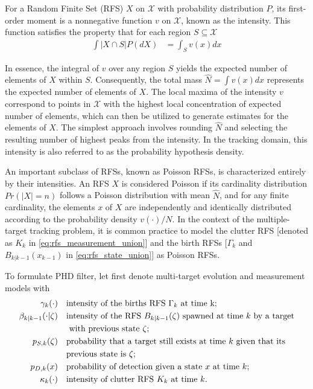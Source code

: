 For a Random Finite Set (RFS) $X$ on $\mathcal{X}$ with probability distribution $P$, its first-order moment is a nonnegative function $v$ on $\mathcal{X}$, known as the intensity. This function satisfies the property that for each region $S \subseteq \mathcal{X}$ \cite{daley2003}
\begin{align}
    \int |X \cap S | P(dX) &= \int_S v(x)dx
\end{align}

In essence, the integral of $v$ over any region $S$ yields the expected number of elements of $X$ within $S$. Consequently, the total mass $\hat{N} = \int v(x)dx$ represents the expected number of elements of $X$. The local maxima of the intensity $v$ correspond to points in $\mathcal{X}$ with the highest local concentration of expected number of elements, which can then be utilized to generate estimates for the elements of $X$. The simplest approach involves rounding $\hat{N}$ and selecting the resulting number of highest peaks from the intensity. In the tracking domain, this intensity is also referred to as the probability hypothesis density.

An important subclass of RFSs, known as Poisson RFSs, is characterized entirely by their intensities. An RFS $X$ is
considered Poisson if its cardinality distribution $Pr(|X| = n)$ follows a Poisson distribution with mean $\hat{N}$,
and for any finite cardinality, the elements $x$ of $X$ are independently and identically distributed according to
the probability density $v(\cdot)/N$. In the context of the multiple-target tracking problem, it is common practice to model the clutter RFS [denoted as $K_k$ in \eqref{eq:rfs_measurement_union}] and the birth RFSs [$\Gamma_k $ and $B_{k|k-1}(x_{k-1})$ in \eqref{eq:rfs_state_union}] as Poisson RFSs.

To formulate PHD filter, let first denote multi-target evolution and measurement models with
\begin{align}
    \gamma_k(\cdot) \quad & \text{intensity of the births RFS $\Gamma_k$ at time k;} \\
    \beta_{k|k-1}(\cdot|\zeta) \quad & \text{intensity of the RFS $B_{k|k-1}(\zeta)$ spawned at time $k$ by a target} \notag \\
                                 \quad &  \text{ with previous state $\zeta$;} \\
    p_{S,k}(\zeta) \quad & \text{probability that a target still exists at time $k$ given that its } \notag \\
                    \quad & \text{previous state is $\zeta$;} \\
    p_{D,k}(x) \quad & \text{probability of detection given a state $x$ at time $k$;} \\
    \kappa_k(\cdot) \quad & \text{intensity of clutter RFS $K_k$ at time $k$}.
\end{align}

